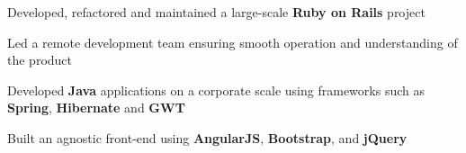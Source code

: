 \documentclass[]{resume}
\begin{document}
\begin{minipage}[t]{0.66\textwidth}

\begin{tightemize}
\item Developed, refactored and maintained a large-scale \textbf{Ruby on Rails} project
\item Led a remote development team ensuring smooth operation and understanding of the product
\end{tightemize}
\sectionsep

\begin{tightemize}
\item Developed \textbf{Java} applications on a corporate scale using frameworks such as \textbf{Spring}, \textbf{Hibernate} and \textbf{GWT}
\item Built an agnostic front-end using \textbf{AngularJS}, \textbf{Bootstrap}, and \textbf{jQuery}
\end{tightemize}
\sectionsep




\end{minipage}
\end{document}
